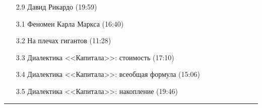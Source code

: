 \documentclass[a4paper]{article}
\begin{document}
{{\begin{description}
\begin{itemize}
\item[2.9]  Давид Рикардо (19:59)
\end{itemize}
\item[Week 3]\hspace*{1cm}
\begin{itemize}
\item[3.1]  Феномен Карла Маркса (16:40)
\item[3.2]  На плечах гигантов (11:28)
\item[3.3]  Диалектика <<Капитала>>: стоимость (17:10)
\item[3.4]  Диалектика <<Капитала>>: всеобщая формула (15:06)
\item[3.5]  Диалектика <<Капитала>>: накопление (19:46)
\end{itemize}
\end{description}}}
\hrule
\end{document}
